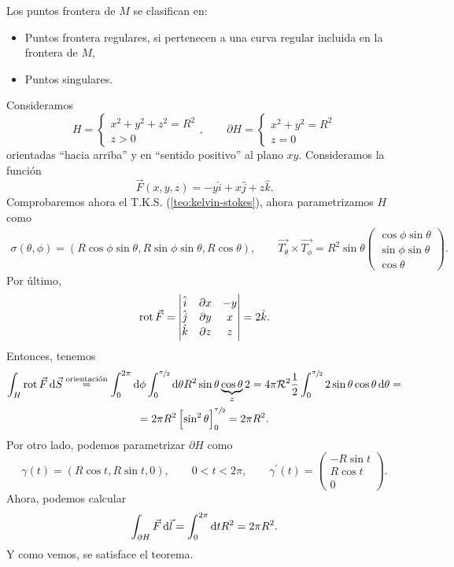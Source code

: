 \begin{obs*}
    Los puntos frontera de $M$ se clasifican en:
    \begin{itemize}
        \item Puntos frontera regulares, si pertenecen a una curva regular incluida en la frontera de $M$,
        \item Puntos singulares.
    \end{itemize}
\end{obs*}

\begin{example*}
    Consideramos
    \[
        H =
        \begin{cases}
            x^2 + y^2 + z^2 = R^2 \\ z > 0
        \end{cases},
        \qquad
        \partial H  =
        \begin{cases}
            x^2 + y^2 = R^2 \\ z = 0
        \end{cases}
    \]
    orientadas ``hacia arriba'' y en ``sentido positivo'' al plano $xy$. Consideramos la función
    \[
        \vec{F}(x, y, z) = -y \hat{i} + x \hat{j} + z \hat{k}.
    \]
    Comprobaremos ahora el T.K.S. (\ref{teo:kelvin-stokes}), ahora parametrizamos $H$ como
    \begin{gather*}
        \sigma\left( \theta, \phi \right) = \left( R\cos\phi\sin\theta, R\sin\phi\sin\theta, R\cos\theta \right),
        \qquad
        \vec{T_\theta} \times \vec{T_\phi} = R^2 \sin\theta
        \begin{pmatrix}
            \cos\phi\sin\theta \\ \sin\phi\sin\theta \\ \cos\theta
        \end{pmatrix}.
    \end{gather*}
    Por último, 
    \[
        \operatorname{rot} \vec{F} = \begin{vmatrix}\hat{i} & \partial x & - y \\ \hat{j} & \partial y & x \\ \hat{k} & \partial z & z\end{vmatrix} = 2 \hat{k}.
    \]
    Entonces, tenemos
    \begin{gather*}
        \int_H \rot \vec{F} \dif \vec{S} \stackrel{\text{orientación}}{=} \int^{2\pi}_0 \dif \phi \int^{\sfrac{\pi}{2}}_0 \dif \theta R^2 \sin \theta \underbrace{\cos\theta}_
        {z} 2 = 4 \pi \R^2 \frac{1}{2} \int^{\sfrac{\pi}{2}}_0 2 \sin\theta\cos\theta \dif \theta =\\= 2\pi R^2 \left[ \sin^2 \theta \right]^{\sfrac{\pi}{2}}_0 = 2\pi R^2.
    \end{gather*}
    Por otro lado, podemos parametrizar $\partial H$ como
    \[
        \gamma(t) = \left( R\cos t, R \sin t, 0 \right), \qquad 0 < t < 2\pi, \qquad
        \gamma^\prime (t) =
        \begin{pmatrix}
            -R \sin t \\ R \cos t \\ 0
        \end{pmatrix}.
    \]
    Ahora, podemos calcular
    \[
        \int_{\partial H} \vec{F} \dif \vec{l} = \int^{2\pi}_{0} \dif t R^2 = 2 \pi R^2.
    \]
    Y como vemos, se satisface el teorema.
\end{example*}

